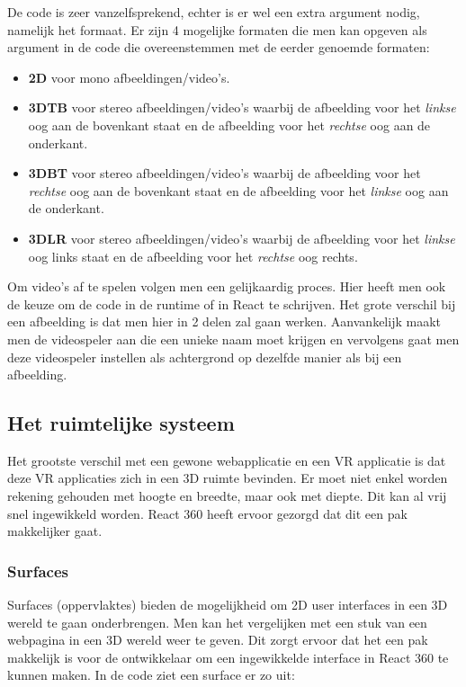 De code is zeer vanzelfsprekend, echter is er wel een extra argument nodig, namelijk het formaat. Er zijn 4 mogelijke formaten die men kan opgeven als argument in de code die overeenstemmen met de eerder genoemde formaten:

\begin{itemize}
	\item \textbf{2D} voor mono afbeeldingen/video's.
	\item \textbf{3DTB} voor stereo afbeeldingen/video's waarbij de afbeelding voor het \textit{linkse} oog  aan de bovenkant staat en de afbeelding voor het \textit{rechtse} oog aan de onderkant.
	\item \textbf{3DBT} voor stereo afbeeldingen/video's waarbij de afbeelding voor het \textit{rechtse} oog aan de bovenkant staat en de afbeelding voor het \textit{linkse} oog aan de onderkant.
	\item \textbf{3DLR} voor stereo afbeeldingen/video's waarbij de afbeelding voor het \textit{linkse} oog links staat en de afbeelding voor het \textit{rechtse} oog rechts.
\end{itemize}

Om video's af te spelen volgen men een gelijkaardig proces. Hier heeft men ook de keuze om de code in de runtime of in React te schrijven. Het grote verschil bij een afbeelding is dat men hier in 2 delen zal gaan werken. Aanvankelijk maakt men de videospeler aan die een unieke naam moet krijgen en vervolgens gaat men deze videospeler instellen als achtergrond op dezelfde manier als bij een afbeelding.

\subsection{Het ruimtelijke systeem}
\label{subsec:ruimtelijk-systeem}
Het grootste verschil met een gewone webapplicatie en een VR applicatie is dat deze VR applicaties zich in een 3D ruimte bevinden. Er moet niet enkel worden rekening gehouden met hoogte en breedte, maar ook met diepte. Dit kan al vrij snel ingewikkeld worden. React 360 heeft ervoor gezorgd dat dit een pak makkelijker gaat.

\subsubsection{Surfaces}
\label{ssubsec:surfaces}
Surfaces (oppervlaktes) bieden de mogelijkheid om 2D user interfaces in een 3D wereld te gaan onderbrengen. Men kan het vergelijken met een stuk van een webpagina in een 3D wereld weer te geven. Dit zorgt ervoor dat het een pak makkelijk is voor de ontwikkelaar om een ingewikkelde interface in React 360 te kunnen maken. In de code ziet een surface er zo uit:

